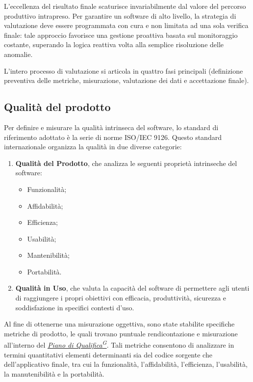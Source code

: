 \documentclass[a4paper,12pt]{article}
\providecommand{\glslink}[2]{\href{https://alittlebyte-19.github.io/Documentazione/glossario.html\#gls-#1}{\underline{#2}\textsuperscript{\scriptsize G}}}
\begin{document}
L'eccellenza del risultato finale scaturisce invariabilmente dal valore del percorso produttivo intrapreso. Per garantire un software di alto livello, la strategia di valutazione deve essere programmata con cura e non limitata ad una sola verifica finale: tale approccio favorisce una gestione proattiva basata sul monitoraggio costante, superando la logica reattiva volta alla semplice risoluzione delle anomalie.

L'intero processo di valutazione si articola in quattro fasi principali (definizione preventiva delle metriche, misurazione, valutazione dei dati e accettazione finale).

\subsection{Qualità del prodotto}
Per definire e misurare la qualità intrinseca del software, lo standard di riferimento adottato è la serie di norme ISO/IEC 9126. Questo standard internazionale organizza la qualità in due diverse categorie:
\begin{enumerate}
    \item \textbf{Qualità del Prodotto}, che analizza le seguenti proprietà intrinseche del software:
    \begin{itemize}
        \item Funzionalità;
        \item Affidabilità;
        \item Efficienza;
        \item Usabilità;
        \item Mantenibilità;
        \item Portabilità.
    \end{itemize}
    \item \textbf{Qualità in Uso}, che valuta la capacità del software di permettere agli utenti di raggiungere i propri obiettivi con efficacia, produttività, sicurezza e soddisfazione in specifici contesti d'uso.
\end{enumerate}

Al fine di ottenerne una misurazione oggettiva, sono state stabilite specifiche metriche di prodotto, le quali trovano puntuale rendicontazione e misurazione all'interno del \textit{\glslink{piano-di-qualifica}{Piano di Qualifica}}. Tali metriche consentono di analizzare in termini quantitativi elementi determinanti sia del codice sorgente che dell'applicativo finale, tra cui la funzionalità, l'affidabilità, l'efficienza, l'usabilità, la manutenibilità e la portabilità.
\end{document}
